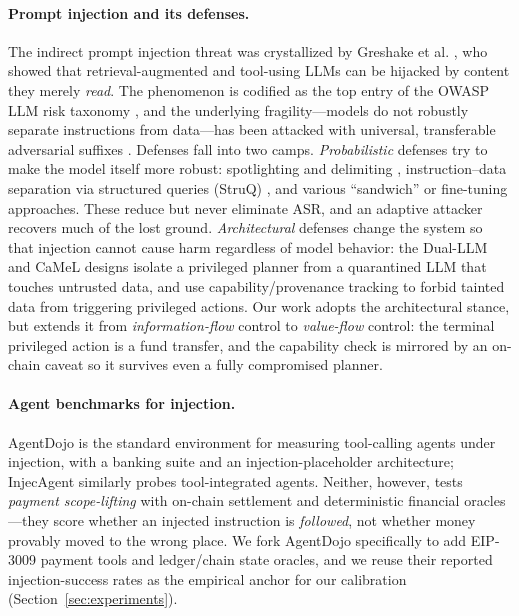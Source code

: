 \documentclass[10pt,twocolumn,letterpaper]{article}
\begin{document}
\paragraph{Prompt injection and its defenses.} The indirect prompt injection threat was crystallized by Greshake et al. \cite{greshake2023}, who showed that retrieval-augmented and tool-using LLMs can be hijacked by content they merely \emph{read}. The phenomenon is codified as the top entry of the OWASP LLM risk taxonomy \cite{owasp2023}, and the underlying fragility---models do not robustly separate instructions from data---has been attacked with universal, transferable adversarial suffixes \cite{zou2023}. Defenses fall into two camps. \emph{Probabilistic} defenses try to make the model itself more robust: spotlighting and delimiting \cite{hines2024}, instruction--data separation via structured queries (StruQ) \cite{chen2024struq}, and various ``sandwich'' or fine-tuning approaches. These reduce but never eliminate ASR, and an adaptive attacker recovers much of the lost ground. \emph{Architectural} defenses change the system so that injection cannot cause harm regardless of model behavior: the Dual-LLM and CaMeL designs \cite{willison2023,camel} isolate a privileged planner from a quarantined LLM that touches untrusted data, and use capability/provenance tracking to forbid tainted data from triggering privileged actions. Our work adopts the architectural stance, but extends it from \emph{information-flow} control to \emph{value-flow} control: the terminal privileged action is a fund transfer, and the capability check is mirrored by an on-chain caveat so it survives even a fully compromised planner.

\paragraph{Agent benchmarks for injection.} AgentDojo \cite{agentdojo} is the standard environment for measuring tool-calling agents under injection, with a banking suite and an injection-placeholder architecture; InjecAgent \cite{injecagent} similarly probes tool-integrated agents. Neither, however, tests \emph{payment scope-lifting} with on-chain settlement and deterministic financial oracles---they score whether an injected instruction is \emph{followed}, not whether money provably moved to the wrong place. We fork AgentDojo specifically to add EIP-3009 payment tools and ledger/chain state oracles, and we reuse their reported injection-success rates as the empirical anchor for our calibration (Section~\ref{sec:experiments}).
\end{document}
